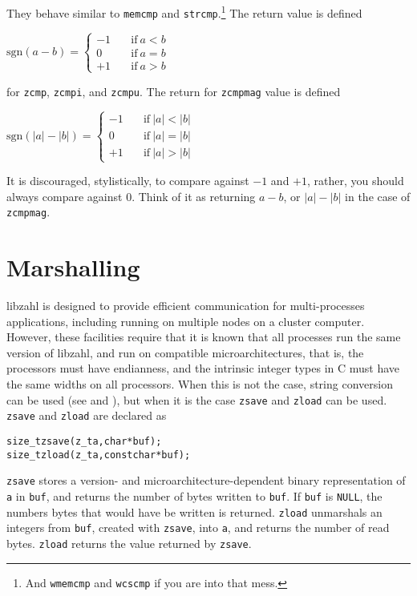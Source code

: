 \noindent
They behave similar to {\tt memcmp} and
{\tt strcmp}.\footnote{And {\tt wmemcmp} and
{\tt wcscmp} if you are into that mess.}
The return value is defined

\vspace{1em}
\(
    \mbox{sgn}(a - b) =
    \left \lbrace \begin{array}{rl}
        -1 & \quad \textrm{if}~a < b \\
         0 & \quad \textrm{if}~a = b \\
        +1 & \quad \textrm{if}~a > b
    \end{array} \right .
\)
\vspace{1em}

\noindent
for {\tt zcmp}, {\tt zcmpi}, and {\tt zcmpu}.
The return for {\tt zcmpmag} value is defined

\vspace{1em}
\(
    \mbox{sgn}(\lvert a \rvert - \lvert b \rvert) =
    \left \lbrace \begin{array}{rl}
        -1 & \quad \textrm{if}~\lvert a \rvert < \lvert b \rvert \\
         0 & \quad \textrm{if}~\lvert a \rvert = \lvert b \rvert \\
        +1 & \quad \textrm{if}~\lvert a \rvert > \lvert b \rvert
    \end{array} \right .
\)
\vspace{1em}

\noindent
It is discouraged, stylistically, to compare against
$-1$ and $+1$, rather, you should always compare
against $0$. Think of it as returning $a - b$, or
$\lvert a \rvert - \lvert b \rvert$ in the case of
{\tt zcmpmag}.


\newpage
\section{Marshalling}
\label{sec:Marshalling}

libzahl is designed to provide efficient communication
for multi-processes applications, including running on
multiple nodes on a cluster computer. However, these
facilities require that it is known that all processes
run the same version of libzahl, and run on compatible
microarchitectures, that is, the processors must have
endianness, and the intrinsic integer types in C must
have the same widths on all processors. When this is not
the case, string conversion can be used (see 
and ), but when it is the case
{\tt zsave} and {\tt zload} can be used. {\tt zsave} and
{\tt zload} are declared as

\begin{alltt}
   size_t zsave(z_t a, char *buf);
   size_t zload(z_t a, const char *buf);
\end{alltt}

\noindent
{\tt zsave} stores a version- and microarchitecture-dependent
binary representation of {\tt a} in {\tt buf}, and returns
the number of bytes written to {\tt buf}. If {\tt buf} is
{\tt NULL}, the numbers bytes that would have be written is
returned. {\tt zload} unmarshals an integers from {\tt buf},
created with {\tt zsave}, into {\tt a}, and returns the number
of read bytes. {\tt zload} returns the value returned by
{\tt zsave}.
